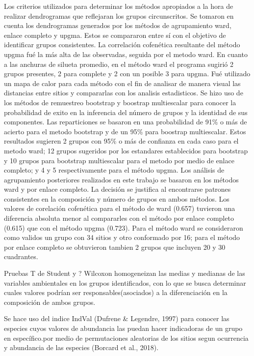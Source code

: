 \documentclass[11pt,]{article}
\begin{document}
Los criterios utilizados para determinar los métodos apropiados a la
hora de realizar dendrogramas que reflejaran los grupos circunscritos.
Se tomaron en cuenta los dendrogramas generados por los métodos de
agrupamiento ward, enlace completo y upgma. Estos se compararon entre sí
con el objetivo de identificar grupos consistentes. La correlación
cofenética resultante del método upgma fué la más alta de las
observadas, seguida por el metodo ward. En cuanto a las anchuras de
silueta promedio, en el método ward el programa sugirió 2 grupos
presentes, 2 para complete y 2 con un posible 3 para upgma. Fué
utilizado un mapa de calor para cada método con el fin de analisar de
manera visual las distancias entre sitios y compararlas con los analisis
estadisticos. Se hizo uso de los métodos de remuestreo bootstrap y
boostrap multiescalar para conocer la probabilidad de exito en la
inferencia del número de grupos y la identidad de sus componentes. Las
reparticiones se basaron en una probabilidad de 91\% o más de acierto
para el metodo bootstrap y de un 95\% para boostrap multiescalar. Estos
resultados sugieren 2 grupos con 95\% o más de confianza en cada caso
para el metodo ward; 12 grupos sugeridos por los estandares establecidos
para bootstrap y 10 grupos para bootstrap multiescalar para el metodo
por medio de enlace completo; y 4 y 5 respectivamente para el método
upgma. Los análisis de agrupamiento posteriores realizados en este
trabajo se basaron en los métodos ward y por enlace completo. La
decisión se justifica al encontrarse patrones consistentes en la
composición y número de grupos en ambos métodos. Los valores de
corelación cofenética para el método de ward (0.657) tuvieron una
diferencia absoluta menor al compararles con el método por enlace
completo (0.615) que con el método upgma (0.723). Para el método ward se
consideraron como validos un grupo con 34 sitios y otro conformado por
16; para el método por enlace completo se obtuvieron tambien 2 grupos
que incluyen 20 y 30 cuadrantes.

Pruebas T de Student y ? Wilcoxon homogeneizan las medias y medianas de
las variables ambientales en los grupos identificados, con lo que se
busca determinar cuales valores podrían ser responsables(asociados) a la
diferenciación en la composición de ambos grupos.

Se hace uso del indice IndVal (Dufrene \& Legendre, 1997) para conocer
las especies cuyos valores de abundancia las puedan hacer indicadoras de
un grupo en específico.por medio de permutaciones aleatorias de los
sitios segun ocurrencia y abundancia de las especies (Borcard et al.,
2018).
\end{document}
